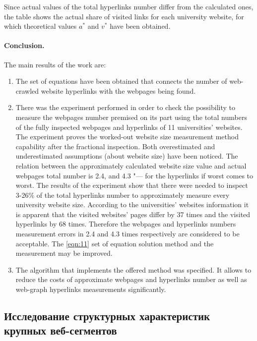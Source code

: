 Since actual values of the total hyperlinks number differ from the calculated ones, the table shows the actual share of visited links for each university website, for which theoretical values \(a^*\) and \(v^*\) have been obtained.

\paragraph{Conclusion.} The main results of the work are:
\begin{enumerate}
	\item The set of equations have been obtained that connects the number of web-crawled website hyperlinks with the webpages being found.
	\item There was the experiment performed in order to check the possibility to measure the webpages number premised on its part using the total numbers of the fully inspected webpages and hyperlinks of 11 universities’ websites. The experiment proves the worked-out website size measurement method capability after the fractional inspection. Both overestimated and underestimated assumptions (about website size) have been noticed. The relation between the approximately calculated website size value and actual webpages total number is 2.4, and 4.3 "--- for the hyperlinks if worst comes to worst. The results of the experiment show that there were needed to inspect 3-26\% of the total hyperlinks number to approximately measure every university website size. According to the universities’ websites information it is apparent that the visited websites’ pages differ by 37 times and the visited hyperlinks by 68 times. Therefore the webpages and hyperlinks numbers measurement errors in 2.4 and 4.3 times respectively are considered to be acceptable. The \cref{eqn:11} set of equation solution method and the measurement may be improved.
	\item The algorithm that implements the offered method was specified. It allows to reduce the costs of approximate webpages and hyperlinks number as well as web-graph hyperlinks measurements significantly.
\end{enumerate}

\subsection{Исследование структурных характеристик крупных веб-сегментов}\label{subsec:ch1/sec4/sub2}

